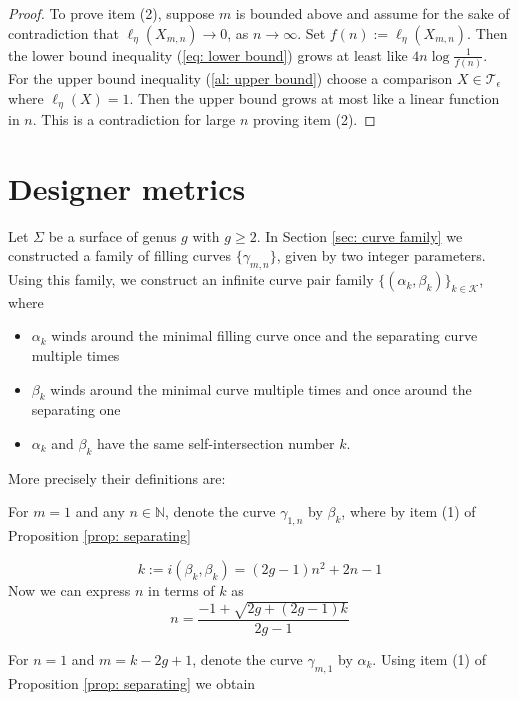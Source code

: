 \documentclass[12pt]{amsart}
\numberwithin{equation}{section}
\theoremstyle{plain}
\begin{document}
\begin{proof}
  To prove item (2), suppose  $m$ is bounded above and assume for the sake of contradiction that 
  $\ell_{\eta}(X_{m,n}) \rightarrow 0$,  as $n \rightarrow \infty$. Set $f(n):=\ell_{\eta}(X_{m,n})$. Then the lower bound inequality (\ref{eq: lower bound}) grows at least like $4n\log \frac{1}{f(n)}$.  For the upper bound inequality (\ref{al: upper bound}) choose a  comparison $X \in \mathcal{T}_{\epsilon}$ where 
  $\ell_{\eta}(X)=1$. Then the upper bound grows at most like   a linear function in $n$. This is a contradiction for large $n$ proving item (2).
\end{proof}




\section{Designer metrics} \label{sec: designer metrics}

Let $\Sigma$ be a surface of genus $g$ with $g \geq 2$. In Section \ref{sec: curve family} we constructed a family of filling curves $\{\gamma_{m,n}\}$, given by two integer parameters.  Using this family,  we construct an infinite  curve pair family $\{(\alpha_{k},\beta_{k})\}_{k \in \mathcal{K}}$, where 
\begin{itemize}
    \item $\alpha_k$ winds around the minimal filling curve once and the separating curve multiple times
    \item $\beta_k$ winds around the minimal curve multiple times and once around the separating one
    \item $\alpha_k$ and $\beta_k$ have the same self-intersection number $k$. 
\end{itemize}


More precisely their definitions are:


\vskip10pt

  For  $m=1$ and  any
$n \in \mathbb{N}$,  denote the curve $\gamma_{1,n}$ by $\beta_{k}$,
where  by item (1) of Proposition \ref{prop: separating}

\begin{equation}\label{eq:intersection k}
k:=i(\beta_{k}, \beta_{k})=(2g-1)n^{2} +2n - 1
 \end{equation}
Now we can express $n$ in terms of $k$ as $$n =\frac{-1 + \sqrt{2g + (2g -1)k }}{2g-1}$$


\vskip10pt
 For $n=1$ and 
$m = k-2g+1$, denote the curve $\gamma_{m,1}$ by $\alpha_{k}$.
Using item (1) of Proposition 
\ref{prop: separating} we obtain 
\end{document}
